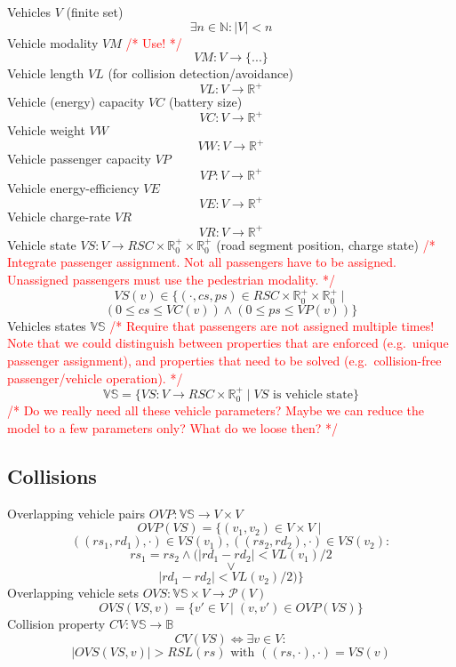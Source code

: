 \documentclass[conference]{IEEEtran}
\newcommand{\todo}[1]{\textcolor{red}{/* #1 */}}
\begin{document}
	Vehicles $V$ (finite set)
	\[
		\exists n \in \mathbb{N} : |V| < n
	\]
	Vehicle modality $VM$ \todo{Use!}
	\[
		VM: V \rightarrow \{...\}
	\]
	Vehicle length $VL$ (for collision detection/avoidance)
	\[
		VL : V \rightarrow \mathbb{R}^+
	\]
	Vehicle (energy) capacity $VC$ (battery size)
	\[
		VC : V \rightarrow \mathbb{R}^+
	\]
	Vehicle weight $VW$
	\[
		VW : V \rightarrow \mathbb{R}^+
	\]
	Vehicle passenger capacity $VP$
	\[
		VP : V \rightarrow \mathbb{R}^+
	\]
	Vehicle energy-efficiency $VE$ 
		\[
		VE : V \rightarrow \mathbb{R}^+
	\]
	Vehicle charge-rate $VR$ 
		\[
		VR : V \rightarrow \mathbb{R}^+
	\]
	Vehicle state $VS : V \rightarrow RSC \times \mathbb{R}_0^+ \times \mathbb{R}_0^+$ (road segment position, charge state) \todo{Integrate passenger assignment. Not all passengers have to be assigned. Unassigned passengers must use the pedestrian modality.}
	\[
		VS(v) \in \{ (\cdot, cs, ps) \in RSC \times \mathbb{R}_0^+ \times \mathbb{R}_0^+ \mid
	\]
	\[
		(0 \leq cs \leq VC(v)) \wedge (0 \leq ps \leq VP(v)) \}
	\]
	Vehicles states $\mathbb{VS}$ \todo{Require that passengers are not assigned multiple times! Note that we could distinguish between properties that are enforced (e.g.\ unique passenger assignment), and properties that need to be solved (e.g.\ collision-free passenger/vehicle operation).}
	\[
		\mathbb{VS} = \{VS : V \rightarrow RSC \times \mathbb{R}_0^+ \mid VS \text{ is vehicle state}\}
	\]
	\todo{Do we really need all these vehicle parameters? Maybe we can reduce the model to a few parameters only? What do we loose then?}
	
	\subsection{Collisions}
	\label{collisions}
	
	Overlapping vehicle pairs $OVP : \mathbb{VS} \rightarrow V \times V$
	\[
		OVP(VS) = \{(v_1, v_2) \in V \times V \mid
	\]
	\[
		((rs_1,rd_1),\cdot) \in VS(v_1), ((rs_2,rd_2),\cdot) \in VS(v_2) :
	\]
	\[
		rs_1 = rs_2 \wedge (|rd_1 - rd_2| < VL(v_1) / 2
	\]
	\[
		\vee
	\]
	\[
		|rd_1 - rd_2| < VL(v_2) / 2)\}
	\]
	Overlapping vehicle sets $OVS : \mathbb{VS} \times V \rightarrow \mathcal{P}(V)$
	\[
		OVS(VS,v) = \{v' \in V \mid (v, v') \in OVP(VS)\}
	\]
	Collision property $CV : \mathbb{VS} \rightarrow \mathbb{B}$
	\[
		CV(VS) \Leftrightarrow \exists v \in V :
	\]
	\[
		|OVS(VS, v)| > RSL(rs) \text{ with } ((rs,\cdot),\cdot) = VS(v)
	\]
	
\end{document}
